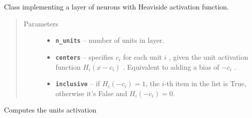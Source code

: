 \documentclass[letterpaper,10pt,english]{sphinxmanual}
\begin{document}

\begin{fulllineitems}
\label{simpleNNlib_docs:simpleNNlib.HeavisideLayer}
Class implementing a layer of neurons with Heaviside activation function.
\begin{quote}\begin{description}
\item[{Parameters}] \leavevmode\begin{itemize}
\item {} 
\textbf{\texttt{n\_units}} -- number of units in layer.

\item {} 
\textbf{\texttt{centers}} -- specifies \(c_i\) for each unit \(i\) , given the unit activation function \(H_i(x-c_i)\) .
Equivalent to adding a bias of \(-c_i\) .

\item {} 
\textbf{\texttt{inclusive}} -- if \(H_i(-c_i)=1\), the \(i\)-th item in the list is True, 
otherwise it's False and \(H_i(-c_i)=0\).

\end{itemize}

\end{description}\end{quote}

\begin{fulllineitems}
\label{simpleNNlib_docs:simpleNNlib.HeavisideLayer.activate}
Computes the units activation

\end{fulllineitems}


\end{fulllineitems}

\end{document}
